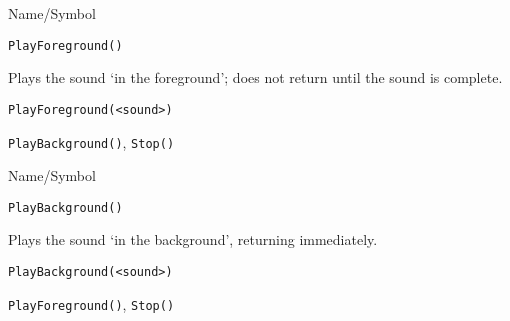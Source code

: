 \vfill
\newpage
{}
\vfill


\begin{desc}{Name/Symbol}
\item[Name/Symbol]	\verb+PlayForeground()+  

\item[Description]	Plays the sound `in the foreground'; 
		does not return until the sound is complete.

\item[Usage]		
\begin{verbatim}
PlayForeground(<sound>)
\end{verbatim}

\item[Example]	

\item[See Also]	\verb+PlayBackground()+, \verb+Stop()+
\end{desc}

\begin{desc}{Name/Symbol}
\item[Name/Symbol]	\verb+PlayBackground()+
 
\item[Description]	Plays the sound `in the background', returning immediately.

\item[Usage]		
\begin{verbatim}
PlayBackground(<sound>)
\end{verbatim}

\item[Example]	

\item[See Also]	\verb+PlayForeground()+, \verb+Stop()+
\end{desc}


